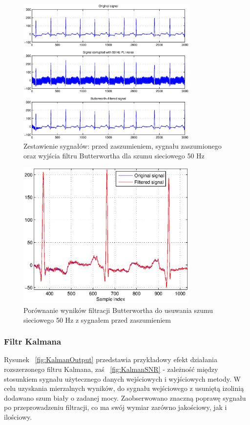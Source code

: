 \begin{figure}[H]
\centering
	\includegraphics[width=0.8\textwidth]{ECG_BASELINE/figures/50hz.eps}
\caption{Zestawienie sygnałów: przed zaszumieniem, sygnału zaszumionego oraz wyjścia filtru Butterwortha dla szumu sieciowego 50 Hz}
\label{fig:50hz_comparison}
\end{figure}

\begin{figure}[H]
\centering
	\includegraphics[width=0.8\textwidth]{ECG_BASELINE/figures/50hz_zoom.eps}
\caption{Porównanie wyników filtracji Butterwortha do usuwania szumu sieciowego 50 Hz z sygnałem przed zaszumieniem}
\label{fig:50hz_zoom}
\end{figure}


\subsubsection{Filtr Kalmana}
Rysunek ~\ref{fig:KalmanOutput} przedstawia przykładowy efekt działania rozszerzonego filtru Kalmana, zaś ~\ref{fig:KalmanSNR} - zależność między stosunkiem sygnału użytecznego danych wejściowych i wyjściowych metody. W celu uzyskania mierzalnych wyników, do sygnału wejściowego z usuniętą izolinią dodawano szum biały o zadanej mocy. Zaobserwowano znaczną poprawę sygnału po przeprowadzeniu filtracji, co ma swój wymiar zarówno jakościowy, jak i ilościowy. 

